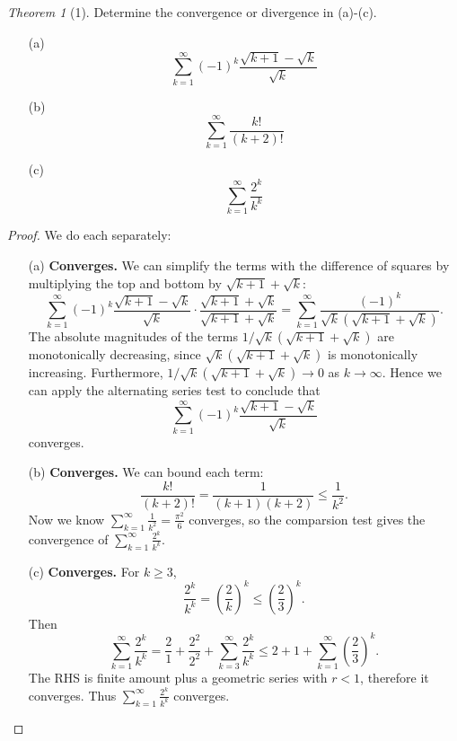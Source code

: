 \documentclass[12pt]{article}
\theoremstyle{remark}
\theoremstyle{named}
\newtheorem*{theorem}{Theorem}
\begin{document}
\begin{theorem}[1]
    Determine the convergence or divergence in (a)-(c).
    \begin{enumerate}
        \item[(a)] 
        \[\sum_{k = 1}^\infty (-1)^k \frac{\sqrt{k + 1} - \sqrt{k}}{\sqrt{k}}\]
        \item[(b)] \[\sum_{k = 1}^\infty \frac{k!}{(k + 2)!}\]
        \item[(c)] \[\sum_{k = 1}^\infty \frac{2^k}{k^k}\]
    \end{enumerate}
\end{theorem}

\begin{proof}
    We do each separately:
    \begin{enumerate}
        \item[(a)] \textbf{Converges.} We can simplify the terms with the difference of squares by multiplying the top and bottom by \(\sqrt{k + 1} + \sqrt{k}\):
        \[\sum_{k = 1}^\infty (-1)^k \frac{\sqrt{k + 1} - \sqrt{k}}{\sqrt{k}} \cdot \frac{\sqrt{k + 1} + \sqrt{k}}{\sqrt{k + 1} + \sqrt{k}} = \sum_{k = 1}^\infty \frac{(-1)^k}{\sqrt{k}(\sqrt{k + 1} + \sqrt{k})}.\] 
        The absolute magnitudes of the terms \(1 / \sqrt{k}(\sqrt{k + 1} + \sqrt{k})\) are monotonically decreasing, since \(\sqrt{k}(\sqrt{k + 1} + \sqrt{k})\) is monotonically increasing. Furthermore, \(1 / \sqrt{k}(\sqrt{k + 1} + \sqrt{k}) \to 0\) as \(k \to \infty\). Hence we can apply the alternating series test to conclude that 
        \[\sum_{k = 1}^\infty (-1)^k \frac{\sqrt{k + 1} - \sqrt{k}}{\sqrt{k}}\]
        converges.
        \item[(b)] \textbf{Converges.} We can bound each term:
        \[\frac{k!}{(k+2)!} = \frac{1}{(k + 1)(k + 2)} \le \frac{1}{k^2}.\] 
        Now we know \(\sum_{k = 1}^\infty \frac{1}{k^2} = \frac{\pi^2}{6}\) converges, so the comparsion test gives the convergence of \(\sum_{k = 1}^\infty \frac{2^k}{k^k}\).
        \item[(c)] \textbf{Converges.} For \(k \ge 3\), 
        \[\frac{2^k}{k^k} = \left(\frac{2}{k}\right)^k \le \left(\frac{2}{3}\right)^k.\] 
        Then 
        \[\sum_{k = 1}^\infty \frac{2^k}{k^k} = \frac{2}{1} + \frac{2^2}{2^2} + \sum_{k = 3}^\infty \frac{2^k}{k^k} \le 2 + 1 + \sum_{k = 1}^\infty \left(\frac{2}{3}\right)^k.\]
        The RHS is finite amount plus a geometric series with \(r < 1\), therefore it converges. Thus \(\sum_{k = 1}^\infty \frac{2^k}{k^k}\) converges.
    \end{enumerate}
\end{proof}
\end{document}
